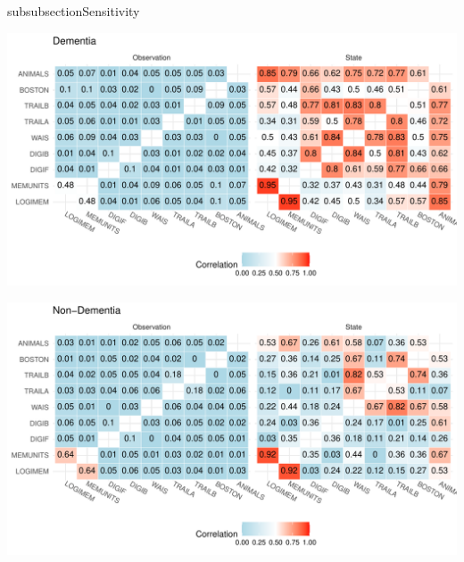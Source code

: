\documentclass[
]{article}
\begin{document}
{subsubsection{Sensitivity}\label{sensitivity}}

\includegraphics{DataAnalysis_files/figure-latex/unnamed-chunk-9-1.pdf}

\includegraphics{DataAnalysis_files/figure-latex/unnamed-chunk-10-1.pdf}
\end{document}
